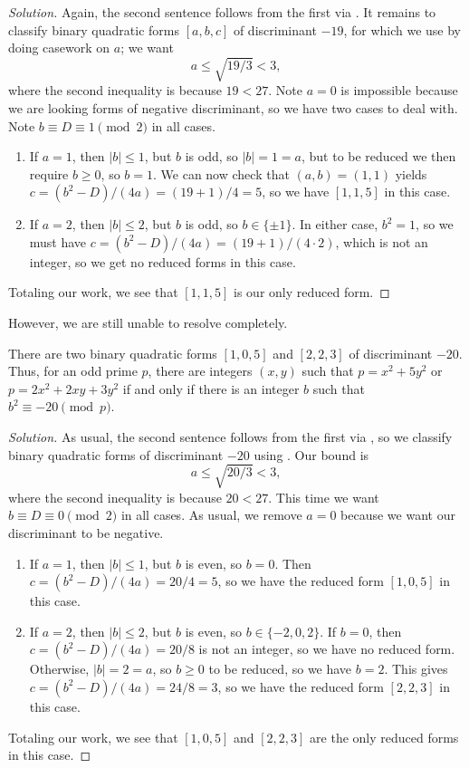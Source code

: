 \documentclass[../notes.tex]{subfiles}
\begin{document}
\begin{proof}[Solution]
	Again, the second sentence follows from the first via . It remains to classify binary quadratic forms $[a,b,c]$ of discriminant $-19$, for which we use  by doing casework on $a$; we want
	\[a\le\sqrt{19/3}<3,\]
	where the second inequality is because $19<27$. Note $a=0$ is impossible because we are looking forms of negative discriminant, so we have two cases to deal with. Note $b\equiv D\equiv1\pmod2$ in all cases.
	\begin{enumerate}
		\item If $a=1$, then $\left|b\right|\le1$, but $b$ is odd, so $\left|b\right|=1=a$, but to be reduced we then require $b\ge0$, so $b=1$. We can now check that $(a,b)=(1,1)$ yields $c=\left(b^2-D\right)/(4a)=(19+1)/4=5$, so we have $[1,1,5]$ in this case.
		\item If $a=2$, then $\left|b\right|\le2$, but $b$ is odd, so $b\in\{\pm1\}$. In either case, $b^2=1$, so we must have $c=\left(b^2-D\right)/(4a)=(19+1)/(4\cdot2)$, which is not an integer, so we get no reduced forms in this case.
	\end{enumerate}
	Totaling our work, we see that $[1,1,5]$ is our only reduced form.
\end{proof}
However, we are still unable to resolve  completely.
\begin{example} \label{ex:almost-full-primes-of-form-5}
	There are two binary quadratic forms $[1,0,5]$ and $[2,2,3]$ of discriminant $-20$. Thus, for an odd prime $p$, there are integers $(x,y)$ such that $p=x^2+5y^2$ or $p=2x^2+2xy+3y^2$ if and only if there is an integer $b$ such that $b^2\equiv-20\pmod p$.
\end{example}
\begin{proof}[Solution]
	As usual, the second sentence follows from the first via , so we classify binary quad\-ratic forms of discriminant $-20$ using . Our bound is
	\[a\le\sqrt{20/3}<3,\]
	where the second inequality is because $20<27$. This time we want $b\equiv D\equiv0\pmod2$ in all cases. As usual, we remove $a=0$ because we want our discriminant to be negative.
	\begin{enumerate}
		\item If $a=1$, then $\left|b\right|\le1$, but $b$ is even, so $b=0$. Then $c=\left(b^2-D\right)/(4a)=20/4=5$, so we have the reduced form $[1,0,5]$ in this case.
		\item If $a=2$, then $\left|b\right|\le2$, but $b$ is even, so $b\in\{-2,0,2\}$. If $b=0$, then $c=\left(b^2-D\right)/(4a)=20/8$ is not an integer, so we have no reduced form. Otherwise, $\left|b\right|=2=a$, so $b\ge0$ to be reduced, so we have $b=2$. This gives $c=\left(b^2-D\right)/(4a)=24/8=3$, so we have the reduced form $[2,2,3]$ in this case.
	\end{enumerate}
	Totaling our work, we see that $[1,0,5]$ and $[2,2,3]$ are the only reduced forms in this case.
\end{proof}
\end{document}
